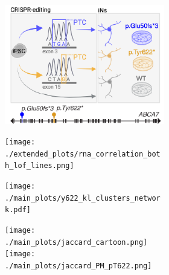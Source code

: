 \begin{figure}[H]
    
    \begin{subfigure}[t]{.24\textwidth}
        \begin{subfigure}[t]{\textwidth}
            \caption{}
            \includegraphics[width=\textwidth]{./main_plots/iN_cartoon.png}        
        \end{subfigure} 
        \begin{subfigure}[t]{\textwidth}
            \caption{}
            \texttt{[image: ./extended\_plots/rna\_correlation\_both\_lof\_lines.png]}        
        \end{subfigure} 
    \end{subfigure} 
    \hspace{.5cm}
    \begin{subfigure}[t]{.23\textwidth}
        \begin{subfigure}[t]{\textwidth}
            \caption{}
            \texttt{[image: ./main\_plots/y622\_kl\_clusters\_network.pdf]}        
        \end{subfigure}
        \begin{subfigure}[t]{\textwidth}
            \caption{}
            \centering
            \texttt{[image: ./main\_plots/jaccard\_cartoon.png]}        
            \texttt{[image: ./main\_plots/jaccard\_PM\_pT622.png]}        
        \end{subfigure}  
    \end{subfigure} 
    \hspace{.25cm}
    \begin{subfigure}[t]{.45\textwidth}

\end{subfigure}
\end{figure}
